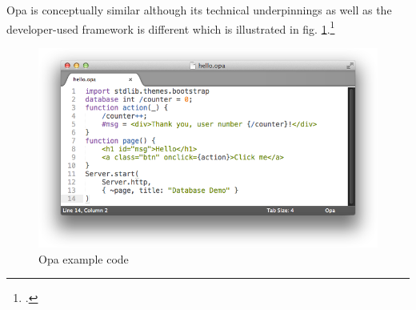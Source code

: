 \begin{appendices}
\begin{subappendices}
Opa is conceptually similar although its technical underpinnings as well as the developer-used framework is different which is illustrated in fig. \ref{img:opa}.\footcite{opa}

\begin{figure}[hbtp]
\centering
\includegraphics[scale=0.5]{img/hello-opa-write}
\caption{Opa example code \label{img:opa}}
\end{figure}




\FloatBarrier


\end{subappendices}
\end{appendices}
